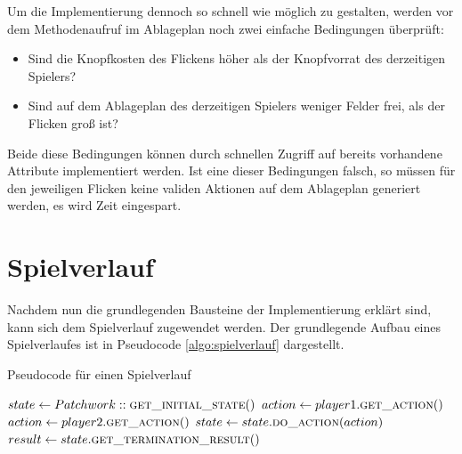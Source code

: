 Um die Implementierung dennoch so schnell wie möglich zu gestalten, werden vor dem Methodenaufruf im Ablageplan noch zwei einfache Bedingungen überprüft:

\begin{itemize}
    \item Sind die Knopfkosten des Flickens höher als der Knopfvorrat des derzeitigen Spielers?
    \item Sind auf dem Ablageplan des derzeitigen Spielers weniger Felder frei, als der Flicken groß ist?
\end{itemize}

Beide diese Bedingungen können durch schnellen Zugriff auf bereits vorhandene Attribute implementiert werden. Ist eine dieser Bedingungen falsch, so müssen für den jeweiligen Flicken keine validen Aktionen auf dem Ablageplan generiert werden, \dash es wird Zeit eingespart.

\section{Spielverlauf}

Nachdem nun die grundlegenden Bausteine der Implementierung erklärt sind, kann sich dem Spielverlauf zugewendet werden. Der grundlegende Aufbau eines Spielverlaufes ist in Pseudocode \ref{algo:spielverlauf} dargestellt.


\vspace*{-0.15cm}
\begin{algorithm}
    \caption{Pseudocode für einen Spielverlauf}
    \label{algo:spielverlauf}
    \begin{algorithmic}[1]
        \State $state \gets Patchwork::\Call{get\_initial\_state}$
        \State $action \gets player1.\Call{get\_action}$
        \Else
        \State $action \gets player2.\Call{get\_action}$
        \EndIf
        \State $state \gets state.\Call{do\_action}{action}$
        \EndWhile
        \State $result \gets state.\Call{get\_termination\_result}$
        \EndFunction
    \end{algorithmic}
\end{algorithm}
\vspace*{-0.15cm}

